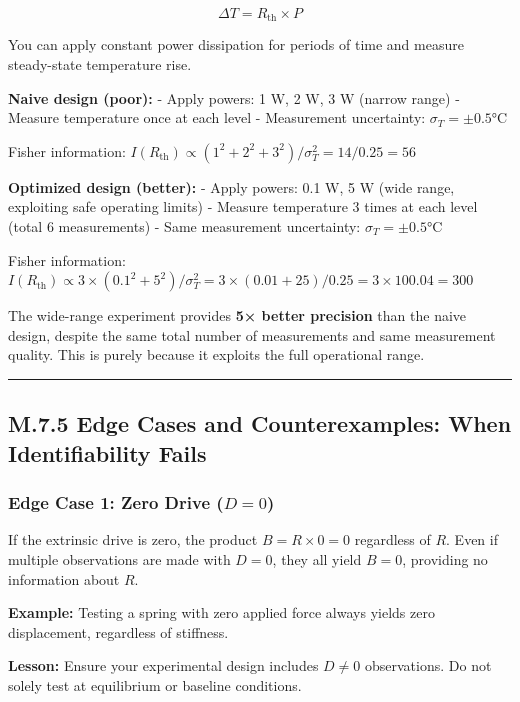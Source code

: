 \documentclass[
]{article}
\begin{document}
\[\Delta T = R_{\text{th}} \times P\]

You can apply constant power dissipation for periods of time and measure
steady-state temperature rise.

\textbf{Naive design (poor):} - Apply powers: 1 W, 2 W, 3 W (narrow
range) - Measure temperature once at each level - Measurement
uncertainty: \(\sigma_T = \pm 0.5°\text{C}\)

Fisher information:
\(I(R_{\text{th}}) \propto (1^2 + 2^2 + 3^2)/\sigma_T^2 = 14/0.25 = 56\)

\textbf{Optimized design (better):} - Apply powers: 0.1 W, 5 W (wide
range, exploiting safe operating limits) - Measure temperature 3 times
at each level (total 6 measurements) - Same measurement uncertainty:
\(\sigma_T = \pm 0.5°\text{C}\)

Fisher information:
\(I(R_{\text{th}}) \propto 3 \times (0.1^2 + 5^2)/\sigma_T^2 = 3 \times (0.01 + 25)/0.25 = 3 \times 100.04 = 300\)

The wide-range experiment provides \textbf{5× better precision} than the
naive design, despite the same total number of measurements and same
measurement quality. This is purely because it exploits the full
operational range.

\begin{center}\rule{0.5\linewidth}{0.5pt}\end{center}

\subsection{M.7.5 Edge Cases and Counterexamples: When Identifiability
Fails}\label{m.7.5-edge-cases-and-counterexamples-when-identifiability-fails}

\subsubsection{\texorpdfstring{Edge Case 1: Zero Drive
(\(D = 0\))}{Edge Case 1: Zero Drive (D = 0)}}\label{edge-case-1-zero-drive-d-0}

If the extrinsic drive is zero, the product \(B = R \times 0 = 0\)
regardless of \(R\). Even if multiple observations are made with
\(D = 0\), they all yield \(B = 0\), providing no information about
\(R\).

\textbf{Example:} Testing a spring with zero applied force always yields
zero displacement, regardless of stiffness.

\textbf{Lesson:} Ensure your experimental design includes \(D \neq 0\)
observations. Do not solely test at equilibrium or baseline conditions.
\end{document}
